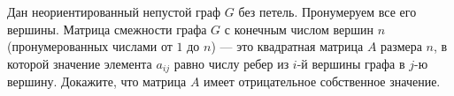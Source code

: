 \documentclass{article}
\begin{document}
Дан неориентированный непустой граф $G$ без петель. Пронумеруем все его вершины. Матрица смежности графа $G$ с конечным числом вершин $n$ (пронумерованных числами от $1$ до $n$) --- это квадратная матрица $A$ размера $n$, в которой значение элемента $a_{ij}$ равно числу ребер из $i$-й вершины графа в $j$-ю вершину. Докажите, что матрица $A$ имеет отрицательное собственное значение.
\end{document}

